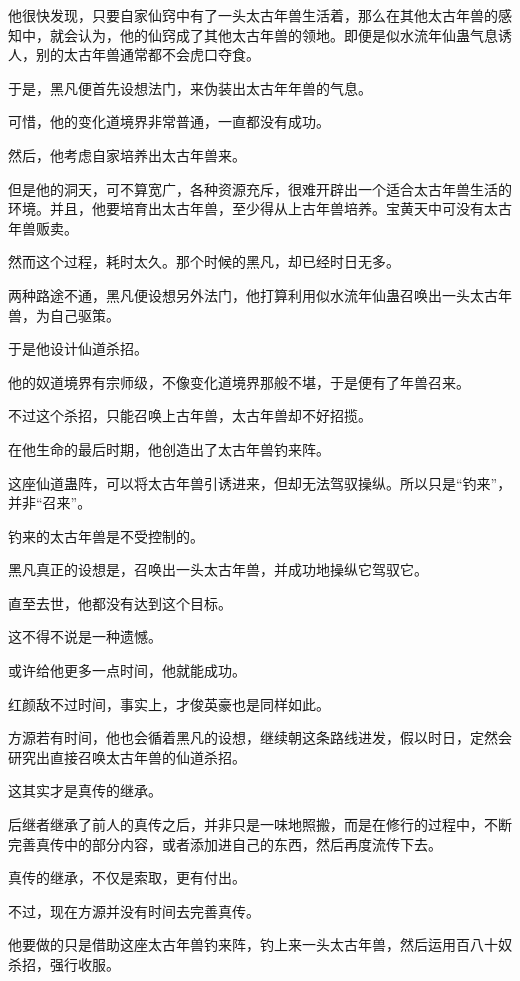 \begin{this_body}
他很快发现，只要自家仙窍中有了一头太古年兽生活着，那么在其他太古年兽的感知中，就会认为，他的仙窍成了其他太古年兽的领地。即便是似水流年仙蛊气息诱人，别的太古年兽通常都不会虎口夺食。

于是，黑凡便首先设想法门，来伪装出太古年年兽的气息。

可惜，他的变化道境界非常普通，一直都没有成功。

然后，他考虑自家培养出太古年兽来。

但是他的洞天，可不算宽广，各种资源充斥，很难开辟出一个适合太古年兽生活的环境。并且，他要培育出太古年兽，至少得从上古年兽培养。宝黄天中可没有太古年兽贩卖。

然而这个过程，耗时太久。那个时候的黑凡，却已经时日无多。

两种路途不通，黑凡便设想另外法门，他打算利用似水流年仙蛊召唤出一头太古年兽，为自己驱策。

于是他设计仙道杀招。

他的奴道境界有宗师级，不像变化道境界那般不堪，于是便有了年兽召来。

不过这个杀招，只能召唤上古年兽，太古年兽却不好招揽。

在他生命的最后时期，他创造出了太古年兽钓来阵。

这座仙道蛊阵，可以将太古年兽引诱进来，但却无法驾驭操纵。所以只是“钓来”，并非“召来”。

钓来的太古年兽是不受控制的。

黑凡真正的设想是，召唤出一头太古年兽，并成功地操纵它驾驭它。

直至去世，他都没有达到这个目标。

这不得不说是一种遗憾。

或许给他更多一点时间，他就能成功。

红颜敌不过时间，事实上，才俊英豪也是同样如此。

方源若有时间，他也会循着黑凡的设想，继续朝这条路线进发，假以时日，定然会研究出直接召唤太古年兽的仙道杀招。

这其实才是真传的继承。

后继者继承了前人的真传之后，并非只是一味地照搬，而是在修行的过程中，不断完善真传中的部分内容，或者添加进自己的东西，然后再度流传下去。

真传的继承，不仅是索取，更有付出。

不过，现在方源并没有时间去完善真传。

他要做的只是借助这座太古年兽钓来阵，钓上来一头太古年兽，然后运用百八十奴杀招，强行收服。


\end{this_body}
